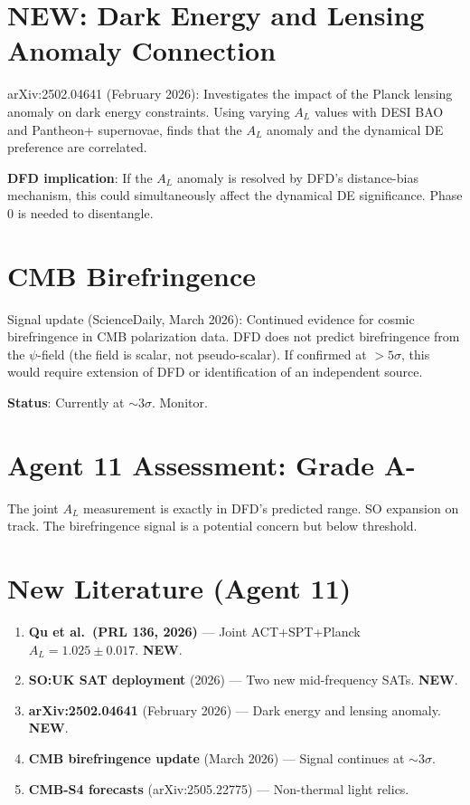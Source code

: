 \documentclass[11pt,a4paper]{article}
\newcommand{\NEW}{\textcolor{dfdblue}{\textbf{NEW}}}
\begin{document}
\section{\NEW: Dark Energy and Lensing Anomaly Connection}

arXiv:2502.04641 (February 2026): Investigates the impact of the Planck lensing anomaly on dark energy constraints. Using varying $A_L$ values with DESI BAO and Pantheon+ supernovae, finds that the $A_L$ anomaly and the dynamical DE preference are correlated.

\textbf{DFD implication}: If the $A_L$ anomaly is resolved by DFD's distance-bias mechanism, this could simultaneously affect the dynamical DE significance. Phase 0 is needed to disentangle.

\section{CMB Birefringence}

Signal update (ScienceDaily, March 2026): Continued evidence for cosmic birefringence in CMB polarization data. DFD does not predict birefringence from the $\psi$-field (the field is scalar, not pseudo-scalar). If confirmed at $> 5\sigma$, this would require extension of DFD or identification of an independent source.

\textbf{Status}: Currently at $\sim 3\sigma$. Monitor.

\section{Agent 11 Assessment: Grade A-}

The joint $A_L$ measurement is exactly in DFD's predicted range. SO expansion on track. The birefringence signal is a potential concern but below threshold.

\section{New Literature (Agent 11)}

\begin{enumerate}
\item \textbf{Qu et al.\ (PRL 136, 2026)} --- Joint ACT+SPT+Planck $A_L = 1.025 \pm 0.017$. \NEW.
\item \textbf{SO:UK SAT deployment} (2026) --- Two new mid-frequency SATs. \NEW.
\item \textbf{arXiv:2502.04641} (February 2026) --- Dark energy and lensing anomaly. \NEW.
\item \textbf{CMB birefringence update} (March 2026) --- Signal continues at $\sim 3\sigma$.
\item \textbf{CMB-S4 forecasts} (arXiv:2505.22775) --- Non-thermal light relics.
\end{enumerate}
\end{document}
